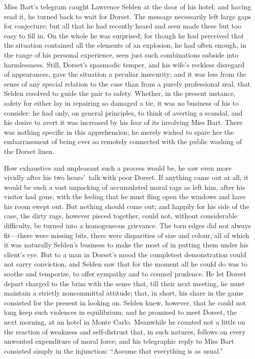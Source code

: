 \documentclass[12pt,a4paper]{book}
\begin{document}






Miss Bart's telegram caught Lawrence Selden at the door of his
hotel; and having read it, he turned back to wait for Dorset. The
message necessarily left large gaps for conjecture; but all that
he had recently heard and seen made these but too easy to fill
in. On the whole he was surprised; for though he had perceived
that the situation contained all the elements of an explosion, he
had often enough, in the range of his personal experience, seen
just such combinations subside into harmlessness. Still, Dorset's
spasmodic temper, and his wife's reckless disregard of
appearances, gave the situation a peculiar insecurity; and it was
less from the sense of any special relation to the case than from
a purely professional zeal, that Selden resolved to guide the
pair to safety. Whether, in the present instance, safety for
either lay in repairing so damaged a tie, it was no business of
his to consider: he had only, on general principles, to think of
averting a scandal, and his desire to avert it was increased by
his fear of its involving Miss Bart. There was nothing specific
in this apprehension; he merely wished to spare her the
embarrassment of being ever so remotely connected with the public
washing of the Dorset linen.





How exhaustive and unpleasant such a process would be, he saw
even more vividly after his two hours'\ talk with poor Dorset. If
anything came out at all, it would be such a vast unpacking of
accumulated moral rags as left him, after his visitor had gone,
with the feeling that he must fling open the windows and have his
room swept out. But nothing should come out; and happily for his
side of the case, the dirty rags, however pieced together, could
not, without considerable difficulty, be turned into a
homogeneous grievance. The torn edges did not always fit---there
were missing bits, there were disparities of size and colour, all
of which it was naturally Selden's business to make the most of
in putting them under his client's eye. But to a man in Dorset's
mood the completest demonstration could not carry conviction, and
Selden saw that for the moment all he could do was to soothe and
temporize, to offer sympathy and to counsel prudence. He let
Dorset depart charged to the brim with the sense that, till
their next meeting, he must maintain a strictly noncommittal
attitude; that, in short, his share in the game consisted for the
present in looking on. Selden knew, however, that he could not
long keep such violences in equilibrium; and he promised to meet
Dorset, the next morning, at an hotel in Monte Carlo. Meanwhile
he counted not a little on the reaction of weakness and
self-distrust that, in such natures, follows on every unwonted
expenditure of moral force; and his telegraphic reply to Miss
Bart consisted simply in the injunction: ``Assume that everything
is as usual.''
\end{document}
